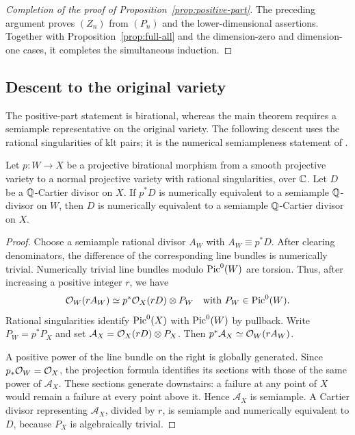 \begin{proof}[Completion of the proof of Proposition~\ref{prop:positive-part}]
The preceding argument proves $(Z_n)$ from $(P_n)$ and the
lower-dimensional assertions.  Together with
Proposition~\ref{prop:full-all} and the dimension-zero and
dimension-one cases, it completes the simultaneous induction.
\end{proof}

\subsection{Descent to the original variety}

The positive-part statement is birational, whereas the main theorem
requires a semiample representative on the original variety.  The
following descent uses the rational singularities of klt pairs;
it is the numerical semiampleness statement of
\cite[Lemma 2.14]{LP}.

\begin{lemma}\label{lemma:numsemiample-descent}
Let $p\colon W\to X$ be a projective birational morphism from a
smooth projective variety to a normal projective variety with
rational singularities, over $\mathbb C$.  Let $D$ be a $\mathbb Q$-Cartier
divisor on $X$.  If $p^*D$ is numerically equivalent to a semiample
$\mathbb Q$-divisor on $W$, then $D$ is numerically equivalent to a
semiample $\mathbb Q$-Cartier divisor on $X$.
\end{lemma}

\begin{proof}
Choose a semiample rational divisor $A_W$ with $A_W\equiv p^*D$.
After clearing denominators, the difference of the corresponding
line bundles is numerically trivial.  Numerically trivial line
bundles modulo $\operatorname{Pic}^0(W)$ are torsion.  Thus, after increasing a
positive integer $r$, we have
\[
                 \mathcal O_W(rA_W)\simeq p^*\mathcal O_X(rD)\otimes P_W
                 \quad\text{with }P_W\in\operatorname{Pic}^0(W).
\]
Rational singularities identify $\operatorname{Pic}^0(X)$ with $\operatorname{Pic}^0(W)$ by
pullback.  Write $P_W=p^*P_X$ and set
$\mathcal A_X=\mathcal O_X(rD)\otimes P_X$.  Then
$p^*\mathcal A_X\simeq\mathcal O_W(rA_W)$.

A positive power of the line bundle on the right is globally
generated.  Since $p_*\mathcal O_W=\mathcal O_X$, the projection formula
identifies its sections with those of the same power of
$\mathcal A_X$.  These sections generate downstairs: a failure at
any point of $X$ would remain a failure at every point above it.
Hence $\mathcal A_X$ is semiample.  A Cartier divisor representing
$\mathcal A_X$, divided by $r$, is semiample and numerically
equivalent to $D$, because $P_X$ is algebraically trivial.
\end{proof}

